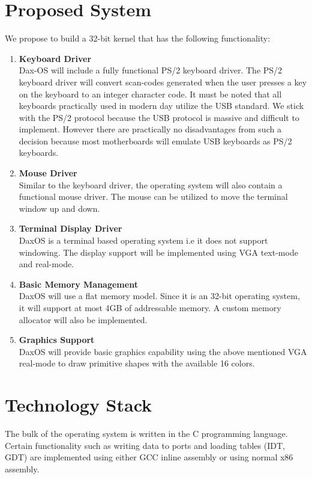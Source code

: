 \section{Proposed System}\label{section:Proposed System}
We propose to build a 32-bit kernel that has the following functionality:\\
\begin{enumerate}
	
	\item \textbf{Keyboard Driver} \\
	Dax-OS will include a fully functional PS/2 keyboard driver. The PS/2 keyboard driver will convert scan-codes generated when the user presses a key on the keyboard to an integer character code. It must be noted that all keyboards practically used in modern day utilize the USB standard. We stick with the PS/2 protocol because the USB protocol is massive and difficult to implement. However there are practically no disadvantages from such a decision because most motherboards will emulate USB keyboards as PS/2 keyboards.
	
	\item \textbf{Mouse Driver} \\
	Similar to the keyboard driver, the operating system will also contain a functional mouse driver. The mouse can be utilized to move the terminal window up and down.
	
	\item \textbf{Terminal Display Driver} \\
	DaxOS is a terminal based operating system i.e it does not support windowing.
	The display support will be implemented using VGA text-mode and real-mode.
	
	\item \textbf{Basic Memory Management} \\
	DaxOS will use a flat memory model. Since it is an 32-bit operating system, it will support at most 4GB of addressable memory. A custom memory allocator will also be implemented.

	\item \textbf{Graphics Support} \\
	DaxOS will provide basic graphics capability using the above mentioned VGA real-mode to draw primitive shapes with the available 16 colors. 
\end{enumerate}

\section{Technology Stack} \label{section:Technology Stack}
The bulk of the operating system is written in the C programming language. Certain functionality such as writing data to ports and loading tables (IDT, GDT) are implemented using either GCC inline assembly or using normal x86 assembly. 

